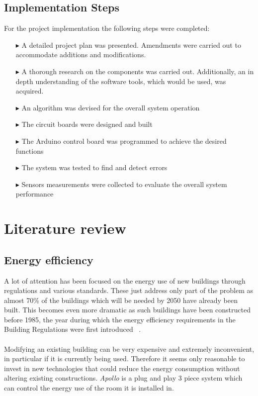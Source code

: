 \documentclass[12pt,a4paper]{report}
\begin{document}
\section{Implementation Steps}
For the project implementation the following steps were completed:
\begin{itemize}
	\item[$\blacktriangleright$] A detailed project plan was presented. 
		Amendments were carried out to accommodate additions and modifications.
	\item[$\blacktriangleright$] A thorough research on the components was carried out. 
		Additionally, an in depth understanding of the software tools, which would be used, was acquired.
	\item[$\blacktriangleright$] An algorithm was devised for the overall system operation
	\item[$\blacktriangleright$] The circuit boards were designed and built
	\item[$\blacktriangleright$] The Arduino control board was programmed to achieve the desired functions
	\item[$\blacktriangleright$] The system was tested to find and detect errors
	\item[$\blacktriangleright$] Sensors measurements were collected to evaluate the overall system performance
\end{itemize}
%
\newpage
\chapter{Literature review}
%
\section{Energy efficiency}
A lot of attention has been focused on the energy use of new buildings through regulations and various standards. These just address only part of the problem as almost 70\% of the buildings which will be needed by 2050 have already been built. This becomes even more dramatic as such buildings have been constructed before 1985, the year during which the energy efficiency requirements in the Building Regulations were first introduced ~\cite{website:building_reg,website:carbon_trust}.
\ \\
\ \\
Modifying an existing building can be very expensive and extremely inconvenient, in particular if it is currently being used. Therefore it seems only reasonable to invest in new technologies that could reduce the energy consumption without altering existing constructions. \emph{Apollo} is a plug and play 3 piece system which can control the energy use of the room it is installed in.\\
\ \\
%
\end{document}
